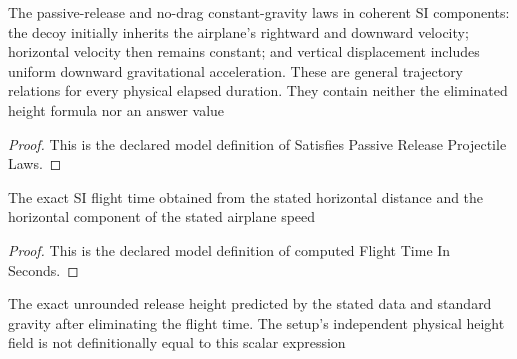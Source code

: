 \begin{definition}
  \label{def:physics:phyx-mini-0738:phyxminiproblems-problemphyxmini0738-satisfiespassivereleaseprojectilelaws}
  The passive-release and no-drag constant-gravity laws in coherent SI components: the decoy initially inherits the airplane's rightward and downward velocity; horizontal velocity then remains constant; and vertical displacement includes uniform downward gravitational acceleration. These are general trajectory relations for every physical elapsed duration. They contain neither the eliminated height formula nor an answer value
\end{definition}
\begin{proof}
  This is the declared model definition of Satisfies Passive Release Projectile Laws.
\end{proof}
\begin{definition}
  \label{def:physics:phyx-mini-0738:phyxminiproblems-problemphyxmini0738-computedflighttimeinseconds}
  The exact SI flight time obtained from the stated horizontal distance and the horizontal component of the stated airplane speed
\end{definition}
\begin{proof}
  This is the declared model definition of computed Flight Time In Seconds.
\end{proof}
\begin{definition}
  \label{def:physics:phyx-mini-0738:phyxminiproblems-problemphyxmini0738-computedreleaseheightinmeters}
  The exact unrounded release height predicted by the stated data and standard gravity after eliminating the flight time. The setup's independent physical height field is not definitionally equal to this scalar expression
\end{definition}

